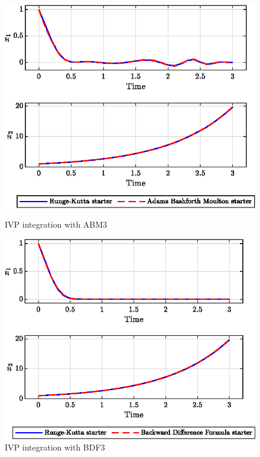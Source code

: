 \documentclass[11pt,a4paper,oneside]{article}
\begin{document}
\begin{figure}[htb]
    \centering
    \begin{minipage}{0.45\textwidth}
        \centering
        \includegraphics*[width=\textwidth, keepaspectratio]{ex7_abm.eps}
        \caption[]{\label{fig:ex7_abm} IVP integration with ABM3}
    \end{minipage}
    \hspace{0.05\textwidth}
    \begin{minipage}{0.45\textwidth}
        \centering
        \includegraphics*[width=\textwidth, keepaspectratio]{ex7_bdf.eps}
        \caption[]{\label{fig:ex7_bdf} IVP integration with BDF3}
    \end{minipage}
\end{figure}
\end{document}
